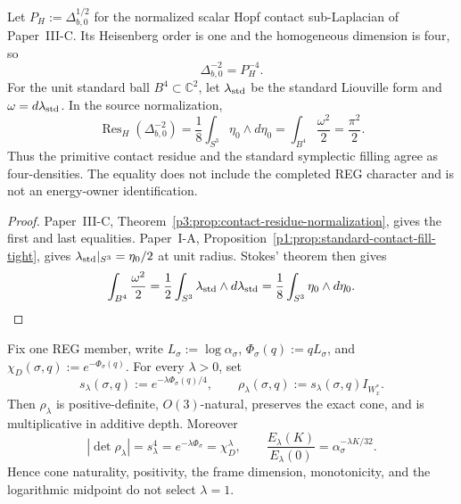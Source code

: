 \documentclass[11pt,a4paper]{article}
\begin{document}
\begin{proposition}
\label{p6:prop:c13-contact-filling-density}
Let $P_H:=\Delta_{b,0}^{1/2}$ for the normalized scalar Hopf contact
sub-Laplacian of Paper~III-C.  Its Heisenberg order is one and the homogeneous
dimension is four, so
\[
 \Delta_{b,0}^{-2}=P_H^{-4}.
\]
For the unit standard ball $B^4\subset\mathbb C^2$, let
$\lambda_{\rm std}$ be the standard Liouville form and
$\omega=d\lambda_{\rm std}$.  In the source normalization,
\begin{equation}
\label{p6:eq:c13-contact-filling-density}
 \operatorname{Res}_H(\Delta_{b,0}^{-2})
 =\frac18\int_{S^3}\eta_0\wedge d\eta_0
 =\int_{B^4}\frac{\omega^2}{2}
 =\frac{\pi^2}{2}.
\end{equation}
Thus the primitive contact residue and the standard symplectic filling agree
as four-densities.  The equality does not include the completed REG character
and is not an energy-owner identification.
\end{proposition}

\begin{proof}
Paper~III-C,
Theorem~\ref{p3:prop:contact-residue-normalization}, gives the first and last
equalities.  Paper~I-A,
Proposition~\ref{p1:prop:standard-contact-fill-tight}, gives
$\lambda_{\rm std}|_{S^3}=\eta_0/2$ at unit radius.  Stokes' theorem then
gives
\[
 \int_{B^4}\frac{\omega^2}{2}
 =\frac12\int_{S^3}\lambda_{\rm std}\wedge d\lambda_{\rm std}
 =\frac18\int_{S^3}\eta_0\wedge d\eta_0.
\]
\end{proof}

\begin{proposition}
\label{p6:prop:c13-lambda-cone-counterfamily}
Fix one REG member, write
$L_\sigma:=\log\alpha_\sigma$,
$\Phi_\sigma(q):=qL_\sigma$, and
$\chi_D(\sigma,q):=e^{-\Phi_\sigma(q)}$.  For every $\lambda>0$, set
\begin{equation}
\label{p6:eq:c13-lambda-cone-counterfamily}
 s_\lambda(\sigma,q):=e^{-\lambda\Phi_\sigma(q)/4},
 \qquad
 \rho_\lambda(\sigma,q):=s_\lambda(\sigma,q)I_{W_x^*}.
\end{equation}
Then $\rho_\lambda$ is positive-definite, $O(3)$-natural, preserves the
exact cone, and is multiplicative in additive depth.  Moreover
\begin{equation}
\label{p6:eq:c13-lambda-frame-determinant}
 |\det\rho_\lambda|
 =s_\lambda^4=e^{-\lambda\Phi_\sigma}=\chi_D^\lambda,
 \qquad
 \frac{E_\lambda(K)}{E_\lambda(0)}
 =\alpha_\sigma^{-\lambda K/32}.
\end{equation}
Hence cone naturality, positivity, the frame dimension, monotonicity, and the
logarithmic midpoint do not select $\lambda=1$.
\end{proposition}
\end{document}
